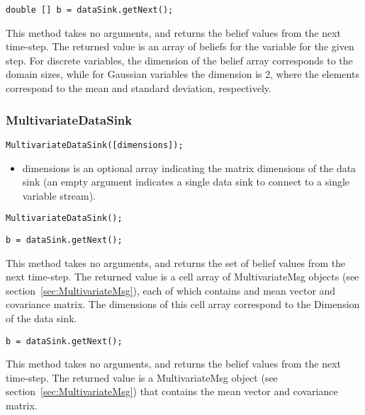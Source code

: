 \fi

\ifjava
\begin{lstlisting}
double [] b = dataSink.getNext();
\end{lstlisting}

This method takes no arguments, and returns the belief values from the next time-step.  The returned value is an array of beliefs for the variable for the given step.  For discrete variables, the dimension of the belief array corresponds to the domain sizes, while for Gaussian variables the dimension is 2, where the elements correspond to the mean and standard deviation, respectively.
\fi

\subsubsection{MultivariateDataSink}


\ifmatlab
\begin{lstlisting}
MultivariateDataSink([dimensions]);
\end{lstlisting}

\begin{itemize}
\item dimensions is an optional array indicating the matrix dimensions of the data sink (an empty argument indicates a single data sink to connect to a single variable stream).
\end{itemize}
\fi

\ifjava
\begin{lstlisting}
MultivariateDataSink();
\end{lstlisting}
\fi


\ifmatlab
\begin{lstlisting}
b = dataSink.getNext();
\end{lstlisting}

This method takes no arguments, and returns the set of belief values from the next time-step.  The returned value is a cell array of MultivariateMsg objects (see section~\ref{sec:MultivariateMsg}), each of which contains and mean vector and covariance matrix.  The dimensions of this cell array correspond to the Dimension of the data sink.
\fi

\ifjava
\begin{lstlisting}
b = dataSink.getNext();
\end{lstlisting}

This method takes no arguments, and returns the belief values from the next time-step.  The returned value is a MultivariateMsg object (see section~\ref{sec:MultivariateMsg}) that contains the mean vector and covariance matrix. 
\fi



